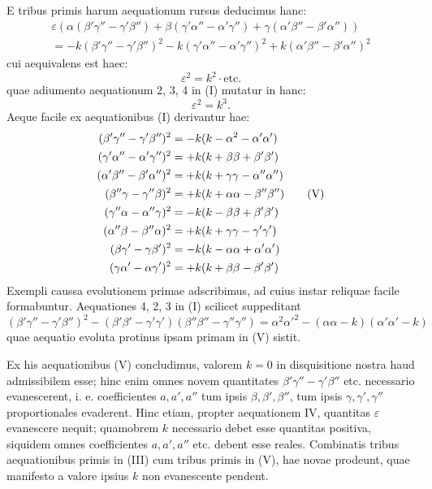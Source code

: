 \documentclass[12pt,a4paper]{article}
\theoremstyle{plain}
\begin{document}
E tribus primis harum aequationum rursus deducimus hanc:
\begin{multline*}
\varepsilon(\alpha(\beta'\gamma'' - \gamma'\beta'') + \beta(\gamma'\alpha'' - \alpha'\gamma'') + \gamma(\alpha'\beta'' - \beta'\alpha''))\\
= -k(\beta'\gamma'' - \gamma'\beta'')^2 - k(\gamma'\alpha'' - \alpha'\gamma'')^2 + k(\alpha'\beta'' - \beta'\alpha'')^2
\end{multline*}
cui aequivalens est haec:
\[
\varepsilon^2 = k^2 \cdot \text{etc.}
\]
quae adiumento aequationum 2, 3, 4 in (I) mutatur in hanc:
\[
\varepsilon^2 = k^3. \tag{IV}
\]
Aeque facile ex aequationibus (I) derivantur hae:
\begin{align} (\beta'\gamma'' - \gamma'\beta'')^2 &= -k(k - \alpha^2 - \alpha'\alpha') \notag\\
(\gamma'\alpha'' - \alpha'\gamma'')^2 &= +k(k + \beta\beta + \beta'\beta') \notag\\
(\alpha'\beta'' - \beta'\alpha'')^2 &= +k(k + \gamma\gamma - \alpha''\alpha'') \notag\\
(\beta''\gamma - \gamma''\beta)^2 &= +k(k + \alpha\alpha - \beta''\beta'') \tag{V}\\
(\gamma''\alpha - \alpha''\gamma)^2 &= -k(k - \beta\beta + \beta'\beta') \notag\\
(\alpha''\beta - \beta''\alpha)^2 &= +k(k + \gamma\gamma - \gamma'\gamma') \notag\\
(\beta\gamma' - \gamma\beta')^2 &= -k(k - \alpha\alpha + \alpha'\alpha') \notag\\
(\gamma\alpha' - \alpha\gamma')^2 &= +k(k + \beta\beta - \beta'\beta') \notag
\end{align}
Exempli caussa evolutionem primae adscribimus, ad cuius instar reliquae facile formabuntur. Aequationes 4, 2, 3 in (I) scilicet suppeditant
\[
(\beta'\gamma'' - \gamma'\beta'')^2 - (\beta'\beta' - \gamma'\gamma')(\beta''\beta'' - \gamma''\gamma'') = \alpha^2\alpha'^2 - (\alpha\alpha - k)(\alpha'\alpha' - k)
\]
quae aequatio evoluta protinus ipsam primam in (V) sistit.

Ex his aequationibus (V) concludimus, valorem $k = 0$ in disquisitione nostra haud admissibilem esse; hinc enim omnes novem quantitates $\beta'\gamma'' - \gamma'\beta''$ etc. necessario evanescerent, i. e. coefficientes $a, a', a''$ tum ipsis $\beta, \beta', \beta''$, tum ipsis
$\gamma, \gamma', \gamma''$ proportionales evaderent. Hinc etiam, propter aequationem IV, quantitas $\varepsilon$ evanescere nequit; quamobrem $k$ necessario debet esse quantitas
positiva, siquidem omnes coefficientes $a, a', a''$ etc. debent esse reales. Combinatis tribus aequationibus primis in (III) cum tribus primis in (V), hae novae prodeunt,
quae manifesto a valore ipsius $k$ non evanescente pendent.
\end{document}
